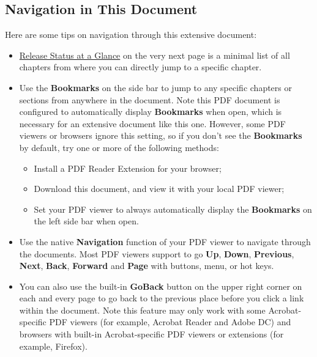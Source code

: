 \subsection*{Navigation in This Document}
Here are some tips on navigation through this extensive document:
\begin{itemize}
    \item \hyperref[tab:release-status]{Release Status at a Glance} on the very next page is a minimal list of all chapters from where you can directly jump to a specific chapter.
    \item Use the \textbf{Bookmarks} on the side bar to jump to any specific chapters or sections from anywhere in the document. Note this PDF document is configured to automatically display \textbf{Bookmarks} when open, which is necessary for an extensive document like this one. However, some PDF viewers or browsers ignore this setting, so if you don't see the \textbf{Bookmarks} by default, try one or more of the following methods:
    \begin{itemize}
        \item Install a PDF Reader Extension for your browser;
        \item Download this document, and view it with your local PDF viewer;
        \item Set your PDF viewer to always automatically display the \textbf{Bookmarks} on the left side bar when open.
    \end{itemize}
    \item Use the native \textbf{Navigation} function of your PDF viewer to navigate through the documents. Most PDF viewers support to go \textbf{Up}, \textbf{Down}, \textbf{Previous}, \textbf{Next}, \textbf{Back}, \textbf{Forward} and
    \textbf{Page} with buttons, menu, or hot keys.
    \item You can also use the built-in \textbf{GoBack} button on the upper right corner on each and every page to go back to the previous place before you click a link within the document. Note this feature may only work with some Acrobat-specific PDF viewers (for example, Acrobat Reader and Adobe DC) and browsers with built-in Acrobat-specific PDF viewers or extensions (for example, Firefox).
\end{itemize}
